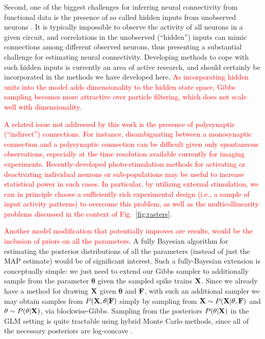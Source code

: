 \documentclass[aoas,preprint]{imsart}
\providecommand{\tr}[1]{\textcolor{red}{#1}}
\newcommand{\bth}{\mathbf{\theta}}
\newcommand{\bF}{{\bf F}}
\newcommand{\bX}{{\bf X}}
\begin{document}
Second, one of the biggest challenges for inferring neural connectivity from functional data is the presence of so called hidden inputs from unobserved neurons \cite{Nykamp05,NYK06,KP06,Vidne08,Vakorin09}. It is typically impossible to observe the activity of all neurons in a given circuit, and correlations in the unobserved (``hidden'') inputs can mimic connections among different observed neurons, thus presenting a substantial challenge for estimating neural connectivity. Developing methods to cope with such hidden inputs is currently an area of active research, and should certainly be incorporated in the methods we have developed here.  \tr{As incorporating hidden units into the model adds dimensionality to the hidden state space, Gibbs sampling becomes more attractive over particle filtering, which does not scale well with dimensionality.}

\tr{A related issue not addressed by this work is the presence of polysynaptic (``indirect'') connections. For instance, disambiguating between a monosynaptic connection and a polysynaptic connection can be difficult given only spontaneous observations, especially at the time resolution available currently for imaging experiments. Recently-developed photo-stimulation methods for activating or deactivating individual neurons or sub-populations \cite{Deisseroth05,SzobotaIsacoff07,Nikolenko08} may be useful to increase statistical power in such cases. In particular, by utilizing external stimulation, we can in principle choose a sufficiently rich experimental design (i.e., a sample of input activity patterns) to overcome this problem, as well as the multicollinearity problems discussed in the context of Fig.~\ref{fig:rasters}.}

\tr{Another model modification that potentially improves are results, would be the inclusion of priors on all the parameters.}  A fully Bayesian algorithm for estimating the posterior distributions of all the parameters (instead of just the MAP estimate) would be of significant interest. Such a fully-Bayesian extension is conceptually simple: we just need to extend our Gibbs sampler to additionally sample from the parameter $\bth$ given the sampled spike trains $\bX$. Since we already have a method for drawing $\bX$ given $\bth$ and $\bF$, with such an additional sampler we may obtain samples from $P(\bX,\bth | \bF)$ simply by sampling from $\bX \sim P(\bX|\theta,\bF)$ and $\bth \sim P(\bth |\bX)$, via blockwise-Gibbs. Sampling from the posteriors $P(\bth|\bX)$ in the GLM setting is quite tractable using hybrid Monte Carlo methods, since all of the necessary posteriors are log-concave \cite{Ishwaran99,Gamerman97,Gamerman98,Yashar08}.
\end{document}
